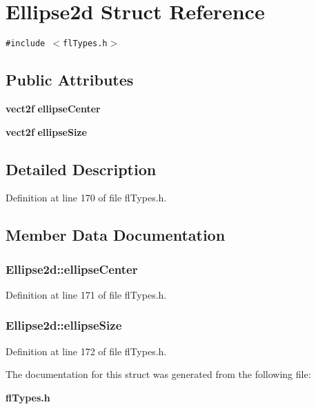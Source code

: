 \section{Ellipse2d Struct Reference}
\label{structEllipse2d}
{\tt \#include $<$fl\-Types.h$>$}

\subsection*{Public Attributes}
\begin{CompactItemize}
\item 
{\bf vect2f} {\bf ellipse\-Center}
\item 
{\bf vect2f} {\bf ellipse\-Size}
\end{CompactItemize}


\subsection{Detailed Description}




Definition at line 170 of file fl\-Types.h.

\subsection{Member Data Documentation}
\subsubsection{ {\bf Ellipse2d::ellipse\-Center}}\label{structEllipse2d_94d4bd06328df425b58286c2159e540a}




Definition at line 171 of file fl\-Types.h.
\subsubsection{ {\bf Ellipse2d::ellipse\-Size}}\label{structEllipse2d_aafba2b113b341b6b909499d1bba3cd1}




Definition at line 172 of file fl\-Types.h.

The documentation for this struct was generated from the following file:\begin{CompactItemize}
\item 
{\bf fl\-Types.h}\end{CompactItemize}
